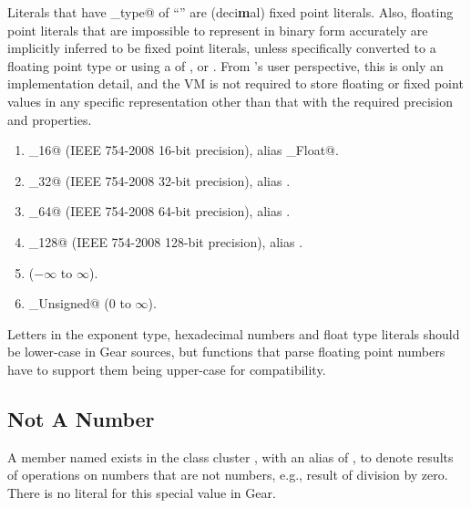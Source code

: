 Literals that have \lstinline@float_type@ of ``'' are (deci{\bf m}al) fixed point literals. Also, floating point literals that are impossible to represent in binary form accurately are implicitly inferred to be fixed point literals, unless specifically converted to a floating point type or using a  of ,  or . From 's user perspective, this is only an implementation detail, and the VM is not required to store floating or fixed point values in any specific representation other than that with the required precision and properties. 

\begin{enumerate}

  \item \lstinline@Float_16@ (IEEE 754-2008 16-bit precision), alias \lstinline@Half_Float@. 
  
  \item \lstinline@Float_32@ (IEEE 754-2008 32-bit precision), alias \lstinline@Float@. 

  \item \lstinline@Float_64@ (IEEE 754-2008 64-bit precision), alias \lstinline@Double@.

  \item \lstinline@Float_128@ (IEEE 754-2008 128-bit precision), alias \lstinline@Quadruple@.

  \item \lstinline@Decimal@ ($-\infty$ to $\infty$).

  \item \lstinline@Decimal_Unsigned@ ($0$ to $\infty$).

\end{enumerate}

Letters in the exponent type, hexadecimal numbers and float type literals should be lower-case in Gear sources, but functions that parse floating point numbers have to support them being upper-case for compatibility. 





\subsection{Not A Number}
\label{sec:nan}

A member named  exists in the class cluster , with an alias of , to denote results of operations on numbers that are not numbers, e.g., result of division by zero. There is no literal for this special value in Gear. 





